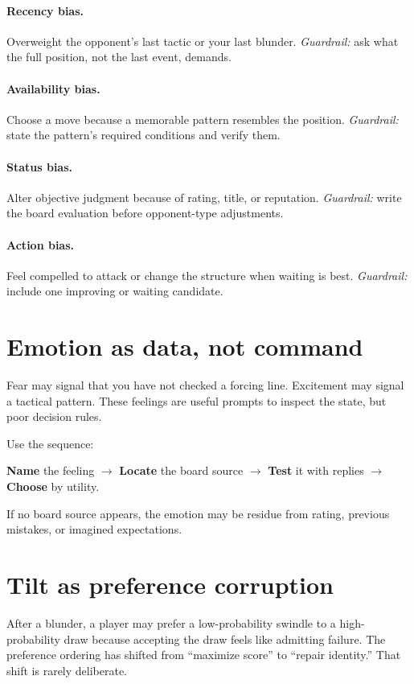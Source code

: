 \paragraph{Recency bias.} Overweight the opponent's last tactic or your last blunder. \textit{Guardrail:} ask what the full position, not the last event, demands.

\paragraph{Availability bias.} Choose a move because a memorable pattern resembles the position. \textit{Guardrail:} state the pattern's required conditions and verify them.

\paragraph{Status bias.} Alter objective judgment because of rating, title, or reputation. \textit{Guardrail:} write the board evaluation before opponent-type adjustments.

\paragraph{Action bias.} Feel compelled to attack or change the structure when waiting is best. \textit{Guardrail:} include one improving or waiting candidate.

\section{Emotion as data, not command}
Fear may signal that you have not checked a forcing line. Excitement may signal a tactical pattern. These feelings are useful prompts to inspect the state, but poor decision rules.

Use the sequence:

\begin{center}
\textbf{Name} the feeling $\rightarrow$ \textbf{Locate} the board source $\rightarrow$ \textbf{Test} it with replies $\rightarrow$ \textbf{Choose} by utility.
\end{center}

If no board source appears, the emotion may be residue from rating, previous mistakes, or imagined expectations.

\section{Tilt as preference corruption}
After a blunder, a player may prefer a low-probability swindle to a high-probability draw because accepting the draw feels like admitting failure. The preference ordering has shifted from ``maximize score'' to ``repair identity.'' That shift is rarely deliberate.

